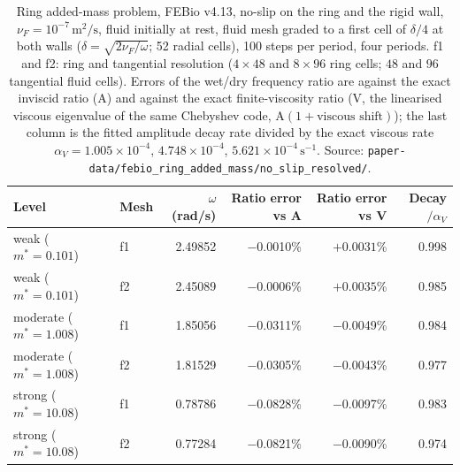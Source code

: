 \begin{table}[htbp]
	\centering
	\small
	\setlength{\tabcolsep}{4pt}
	\caption{Ring added-mass problem, FEBio v4.13, no-slip on the ring and the rigid wall, $\nu_F=10^{-7}\,\mathrm{m^2/s}$, fluid initially at rest, fluid mesh graded to a first cell of $\delta/4$ at both walls ($\delta=\sqrt{2\nu_F/\omega}$; 52 radial cells), 100 steps per period, four periods. f1 and f2: ring and tangential resolution ($4\times48$ and $8\times96$ ring cells; $48$ and $96$ tangential fluid cells). Errors of the wet/dry frequency ratio are against the exact inviscid ratio (A) and against the exact finite-viscosity ratio (V, the linearised viscous eigenvalue of the same Chebyshev code, $\mathrm{A}(1+\text{viscous shift})$); the last column is the fitted amplitude decay rate divided by the exact viscous rate $\alpha_V=1.005\times10^{-4}$, $4.748\times10^{-4}$, $5.621\times10^{-4}\,\mathrm{s^{-1}}$. Source: \texttt{paper-data/febio\_ring\_added\_mass/no\_slip\_resolved/}.}
	\label{tab:ring_febio}
	\begin{tabular}{llrrrr}
		\toprule
		Level & Mesh & $\omega$ (rad/s) & Ratio error vs A & Ratio error vs V & Decay$/\alpha_V$ \\
		\midrule
		weak ($m^*=0.101$) & f1 & 2.49852 & $-$0.0010\% & $+0.0031$\% & 0.998 \\
		weak ($m^*=0.101$) & f2 & 2.45089 & $-$0.0006\% & $+0.0035$\% & 0.985 \\
		moderate ($m^*=1.008$) & f1 & 1.85056 & $-$0.0311\% & $-$0.0049\% & 0.984 \\
		moderate ($m^*=1.008$) & f2 & 1.81529 & $-$0.0305\% & $-$0.0043\% & 0.977 \\
		strong ($m^*=10.08$) & f1 & 0.78786 & $-$0.0828\% & $-$0.0097\% & 0.983 \\
		strong ($m^*=10.08$) & f2 & 0.77284 & $-$0.0821\% & $-$0.0090\% & 0.974 \\
		\bottomrule
	\end{tabular}
\end{table}


